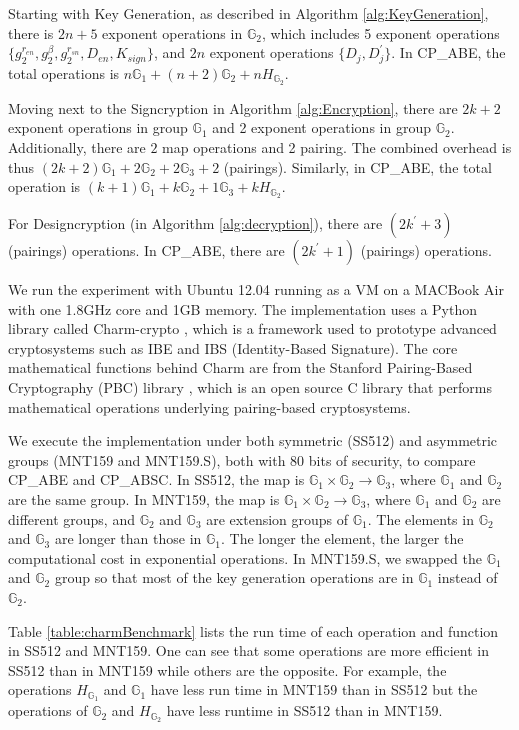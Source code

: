 \documentclass[letterpaper,12pt]{article}
\newcommand{\Gone}{\mathbb{G}_1}
\newcommand{\Gtwo}{\mathbb{G}_2}
\newcommand{\Gthree}{\mathbb{G}_3}
\begin{document}
Starting with Key Generation, as described in Algorithm \ref{alg:KeyGeneration}, there is $2n+5$ exponent operations in $\mathbb{G}_2$, which includes 5 exponent operations $\{g_2^{r_{en}}, g_2^{\beta}, g_2^{r_{sn}}, D_{en}, K_{sign}\}$, and $2n$ exponent operations $\{D_j, D_j^\prime\}$. In CP\_ABE\cite{bethencourt2007ciphertext},  the total operations is $n\Gone + (n+2)\Gtwo + nH_{\Gtwo}$.

Moving next to the Signcryption in Algorithm \ref{alg:Encryption}, there are $2k+2$ exponent operations in group $\mathbb{G}_1$ and 2 exponent operations in group $\mathbb{G}_2$. Additionally, there are $2$ map operations and 2 pairing. The combined overhead is thus $(2k+2)\Gone + 2\Gtwo + 2\Gthree + 2$ (pairings). Similarly, in CP\_ABE, the total operation is $(k+1)\Gone + k\Gtwo + 1\Gthree + kH_{\Gtwo}$.

For Designcryption (in Algorithm \ref{alg:decryption}),  there are $(2k^\prime+3)$ (pairings) operations. In CP\_ABE, there are $(2k^\prime+1)$ (pairings) operations.

We run the experiment with Ubuntu 12.04 running as a VM on a MACBook Air with one 1.8GHz core and 1GB memory. The implementation uses a Python library called Charm-crypto \cite{akinyele2013charm}, which is a framework used to prototype advanced cryptosystems such as IBE and IBS (Identity-Based Signature). The core mathematical functions behind Charm are from the Stanford Pairing-Based Cryptography (PBC) library \cite{pbclibrary}, which is an open source C library that performs mathematical operations underlying pairing-based cryptosystems.

We execute the implementation under both symmetric (SS512) and asymmetric groups (MNT159 and MNT159.S), both with 80 bits of security, to compare CP\_ABE and CP\_ABSC. In SS512, the map is $\Gone \times \Gtwo \rightarrow \Gthree$, where $\Gone$ and $\Gtwo$ are the same group.  In MNT159,  the map is $\Gone \times \Gtwo \rightarrow \Gthree$, where $\Gone$ and $\Gtwo$ are different groups, and $\Gtwo$ and $\Gthree$ are extension groups of $\Gone$. The elements in $\Gtwo$ and $\Gthree$ are longer than those in $\Gone$. The longer the element, the larger the computational cost in exponential operations. In MNT159.S, we swapped the $\Gone$ and $\Gtwo$ group so that most of the key generation operations are in $\Gone$ instead of  $\Gtwo$.

Table \ref{table:charmBenchmark} lists the run time of each operation and function in SS512 and MNT159. One can see that some operations are more efficient in SS512 than in MNT159 while others are the opposite. For example, the operations $H_{\Gone}$ and $\Gone$ have less run time in MNT159 than in SS512 but the operations of $\Gtwo$ and $H_{\Gtwo}$ have less runtime in SS512 than in MNT159. %
\end{document}
